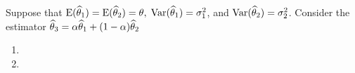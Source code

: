 Suppose that $\E*{\that_1} = \E*{\that_2} = \theta, \; \Var*{\that_1} = \sigma_1^2$, and $\Var*{\that_2} = \sigma_2^2$. Consider the estimator $\widehat{\theta}_3 = \alpha \widehat{\theta}_1 + (1-\alpha)\widehat{\theta}_2$

\begin{enumerate}
\item 
\item 
\end{enumerate}
